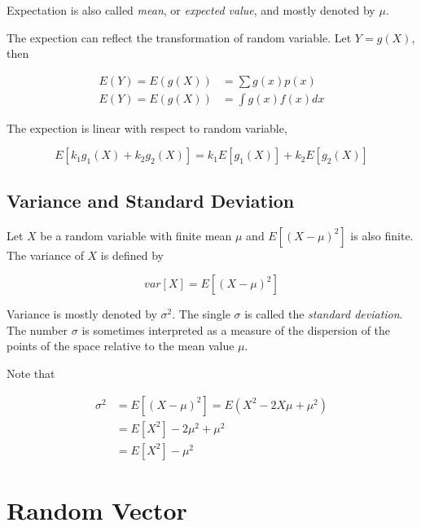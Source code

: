 \documentclass{article}
\begin{document}
            Expectation is also called \textit{mean}, or \textit{expected value},
            and mostly denoted by $ \mu $.

            The expection can reflect the transformation of random variable. Let $ Y = g(X) $, then

            \begin{align*}
                E(Y) = E ( g(X) ) &= \sum g(x) p(x) \\
                E(Y) = E ( g(X) ) &= \int g(x) f(x) dx
            \end{align*}

            The expection is linear with respect to random variable,

            \begin{equation*}
                E [ k_{1} g_{1}(X) + k_{2} g_{2}(X) ] = k_{1} E [ g_{1}(X) ] + k_{2} E [ g_{2}(X) ]
            \end{equation*}

        \subsection{Variance and Standard Deviation}

            Let $ X $ be a random variable with finite mean $ \mu $ and $ E [ (X -
            \mu)^{2} ] $ is also finite. The variance of $ X $ is defined by

            \begin{equation}
                var[ X ] = E [ (X - \mu)^{2} ]
            \end{equation}

            Variance is mostly denoted by $ \sigma^{2} $. The single $ \sigma $ is
            called the \textit{standard deviation}. The number $ \sigma $ is sometimes
            interpreted as a measure of the dispersion of the points of the space
            relative to the mean value $ \mu $.

            Note that

            \begin{align*}
                \sigma^2 &= E [ ( X - \mu )^{2} ] = E ( X^2 - 2 X \mu + \mu^{2} ) \\
                         &= E [ X^{2} ] - 2 \mu^{2} + \mu^{2} \\
                         &= E [ X^{2} ] - \mu^{2}
            \end{align*}

    \section{Random Vector}
\end{document}
